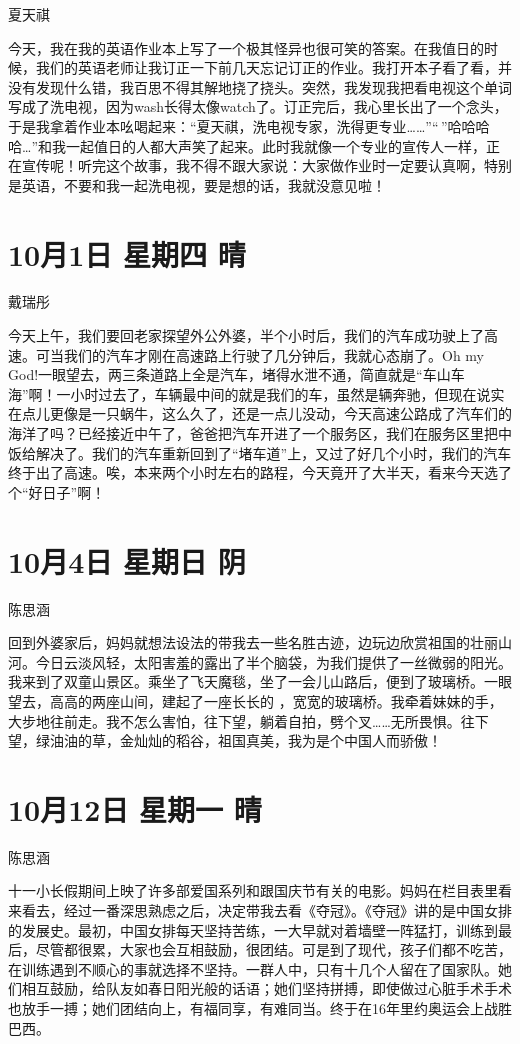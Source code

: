 夏天祺

今天，我在我的英语作业本上写了一个极其怪异也很可笑的答案。在我值日的时候，我们的英语老师让我订正一下前几天忘记订正的作业。我打开本子看了看，并没有发现什么错，我百思不得其解地挠了挠头。突然，我发现我把看电视这个单词写成了洗电视，因为wash长得太像watch了。订正完后，我心里长出了一个念头，于是我拿着作业本吆喝起来：``夏天祺，洗电视专家，洗得更专业\ldots\ldots{}''``\,''哈哈哈哈\ldots''和我一起值日的人都大声笑了起来。此时我就像一个专业的宣传人一样，正在宣传呢！听完这个故事，我不得不跟大家说：大家做作业时一定要认真啊，特别是英语，不要和我一起洗电视，要是想的话，我就没意见啦！

\section{10月1日 星期四 晴}

戴瑞彤

今天上午，我们要回老家探望外公外婆，半个小时后，我们的汽车成功驶上了高速。可当我们的汽车才刚在高速路上行驶了几分钟后，我就心态崩了。Oh
my
God!一眼望去，两三条道路上全是汽车，堵得水泄不通，简直就是``车山车海''啊！一小时过去了，车辆最中间的就是我们的车，虽然是辆奔驰，但现在说实在点儿更像是一只蜗牛，这么久了，还是一点儿没动，今天高速公路成了汽车们的海洋了吗？已经接近中午了，爸爸把汽车开进了一个服务区，我们在服务区里把中饭给解决了。我们的汽车重新回到了``堵车道''上，又过了好几个小时，我们的汽车终于出了高速。唉，本来两个小时左右的路程，今天竟开了大半天，看来今天选了个``好日子''啊！

\section{10月4日 星期日 阴}

陈思涵

回到外婆家后，妈妈就想法设法的带我去一些名胜古迹，边玩边欣赏祖国的壮丽山河。今日云淡风轻，太阳害羞的露出了半个脑袋，为我们提供了一丝微弱的阳光。我来到了双童山景区。乘坐了飞天魔毯，坐了一会儿山路后，便到了玻璃桥。一眼望去，高高的两座山间，建起了一座长长的
，宽宽的玻璃桥。我牵着妹妹的手，大步地往前走。我不怎么害怕，往下望，躺着自拍，劈个叉\ldots\ldots 无所畏惧。往下望，绿油油的草，金灿灿的稻谷，祖国真美，我为是个中国人而骄傲！

\section{10月12日 星期一 晴}

陈思涵

十一小长假期间上映了许多部爱国系列和跟国庆节有关的电影。妈妈在栏目表里看来看去，经过一番深思熟虑之后，决定带我去看《夺冠》。《夺冠》讲的是中国女排的发展史。最初，中国女排每天坚持苦练，一大早就对着墙壁一阵猛打，训练到最后，尽管都很累，大家也会互相鼓励，很团结。可是到了现代，孩子们都不吃苦，在训练遇到不顺心的事就选择不坚持。一群人中，只有十几个人留在了国家队。她们相互鼓励，给队友如春日阳光般的话语；她们坚持拼搏，即使做过心脏手术手术也放手一搏；她们团结向上，有福同享，有难同当。终于在16年里约奥运会上战胜巴西。

